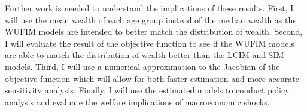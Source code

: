 \documentclass{article}
\begin{document}
Further work is needed to understand the implications of these results. First, I will use the mean wealth of each age group instead of the median wealth as the WUFIM models are intended to better match the distribution of wealth. Second, I will evaluate the result of the objective function to see if the WUFIM models are able to match the distribution of wealth better than the LCIM and SIM models. Third, I will use a numerical approximation to the Jacobian of the objective function which will allow for both faster estimation and more accurate sensitivity analysis. Finally, I will use the estimated models to conduct policy analysis and evaluate the welfare implications of macroeconomic shocks.





\end{document}
